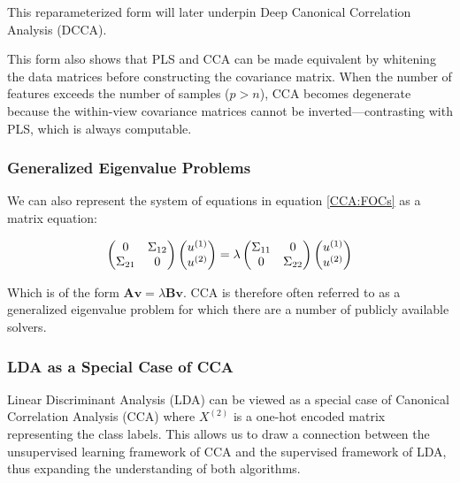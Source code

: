 This reparameterized form will later underpin Deep Canonical Correlation Analysis (DCCA).

This form also shows that PLS and CCA can be made equivalent by whitening the data matrices before constructing the covariance matrix. When the number of features exceeds the number of samples (\(p>n\)), CCA becomes degenerate because the within-view covariance matrices cannot be inverted—contrasting with PLS, which is always computable.

\subsubsection{Generalized Eigenvalue Problems}

We can also represent the system of equations in equation \ref{CCA:FOCs} as a matrix equation:

\begin{align}
    \begin{pmatrix}
        0                    & \Sigma_{12} \\
        \Sigma_{21} & 0
    \end{pmatrix}
    \begin{pmatrix}
        u^{(1)} \\
        u^{(2)}
    \end{pmatrix}
    =
    \lambda
    \begin{pmatrix}
        \Sigma_{11} & 0 \\
        0                    & \Sigma_{22}
    \end{pmatrix}
    \begin{pmatrix}
        u^{(1)} \\
        u^{(2)}
    \end{pmatrix}
\end{align}

Which is of the form $\mathbf{A v} = \lambda \mathbf{B v}$. CCA is therefore often referred to as a generalized eigenvalue problem for which there are a number of publicly available solvers.

\subsubsection{LDA as a Special Case of CCA}

Linear Discriminant Analysis (LDA) can be viewed as a special case of Canonical Correlation Analysis (CCA) where \(X^{(2)}\) is a one-hot encoded matrix representing the class labels.
This allows us to draw a connection between the unsupervised learning framework of CCA and the supervised framework of LDA, thus expanding the understanding of both algorithms.

